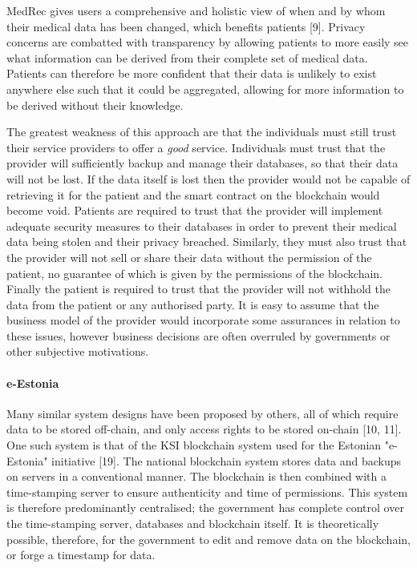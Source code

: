\documentclass[]{article}
\let\oldparagraph\paragraph
\renewcommand{\paragraph}[1]{\oldparagraph{#1}\mbox{}}
\begin{document}
MedRec gives users a comprehensive and holistic view of when and by whom
their medical data has been changed, which benefits patients {[}9{]}.
Privacy concerns are combatted with transparency by allowing patients to
more easily see what information can be derived from their complete set
of medical data. Patients can therefore be more confident that their
data is unlikely to exist anywhere else such that it could be
aggregated, allowing for more information to be derived without their
knowledge.

The greatest weakness of this approach are that the individuals must
still trust their service providers to offer a \emph{good} service.
Individuals must trust that the provider will sufficiently backup and
manage their databases, so that their data will not be lost. If the data
itself is lost then the provider would not be capable of retrieving it
for the patient and the smart contract on the blockchain would become
void. Patients are required to trust that the provider will implement
adequate security measures to their databases in order to prevent their
medical data being stolen and their privacy breached. Similarly, they
must also trust that the provider will not sell or share their data
without the permission of the patient, no guarantee of which is given by
the permissions of the blockchain. Finally the patient is required to
trust that the provider will not withhold the data from the patient or
any authorised party. It is easy to assume that the business model of
the provider would incorporate some assurances in relation to these
issues, however business decisions are often overruled by governments or
other subjective motivations.

\hypertarget{header-n30}{%
\paragraph{e-Estonia}\label{header-n30}}

Many similar system designs have been proposed by others, all of which
require data to be stored off-chain, and only access rights to be stored
on-chain {[}10, 11{]}. One such system is that of the KSI blockchain
system used for the Estonian "e-Estonia" initiative {[}19{]}. The
national blockchain system stores data and backups on servers in a
conventional manner. The blockchain is then combined with a
time-stamping server to ensure authenticity and time of permissions.
This system is therefore predominantly centralised; the government has
complete control over the time-stamping server, databases and blockchain
itself. It is theoretically possible, therefore, for the government to
edit and remove data on the blockchain, or forge a timestamp for data.
\end{document}

